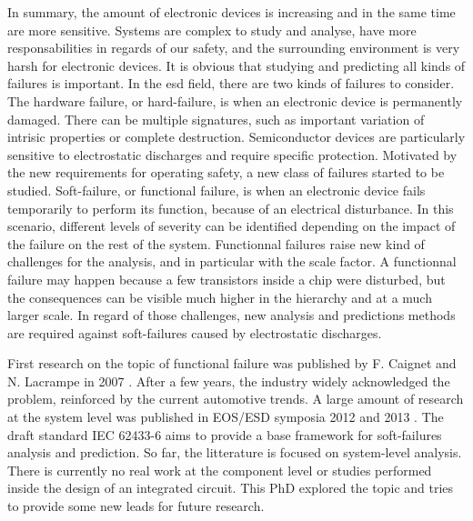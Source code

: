In summary, the amount of electronic devices is increasing and in the same time are more sensitive.
Systems are complex to study and analyse, have more responsabilities in regards of our safety, and the surrounding environment is very harsh for electronic devices.
It is obvious that studying and predicting all kinds of failures is important.
In the \gls{esd} field, there are two kinds of failures to consider.
The hardware failure, or hard-failure, is when an electronic device is permanently damaged.
There can be multiple signatures, such as important variation of intrisic properties or complete destruction.
Semiconductor devices are particularly sensitive to electrostatic discharges \cite{impactESDsemiconductors} and require specific protection.
Motivated by the new requirements for operating safety, a new class of failures started to be studied.
Soft-failure, or functional failure, is when an electronic device fails temporarily to perform its function, because of an electrical disturbance.
In this scenario, different levels of severity can be identified depending on the impact of the failure on the rest of the system.
Functionnal failures raise new kind of challenges for the analysis, and in particular with the scale factor.
A functionnal failure may happen because a few transistors inside a chip were disturbed, but the consequences can be visible much higher in the hierarchy and at a much larger scale.
In regard of those challenges, new analysis and predictions methods are required against soft-failures caused by electrostatic discharges.

First research on the topic of functional failure was published by F. Caignet and N. Lacrampe in 2007 \cite{}.
After a few years, the industry widely acknowledged the problem, reinforced by the current automotive trends.
A large amount of research at the system level was published in EOS/ESD symposia 2012 \cite{} and 2013 \cite{}.
The draft standard IEC 62433-6 aims to provide a base framework for soft-failures analysis and prediction.
So far, the litterature is focused on system-level analysis.
There is currently no real work at the component level or studies performed inside the design of an integrated circuit.
This PhD explored the topic and tries to provide some new leads for future research.

